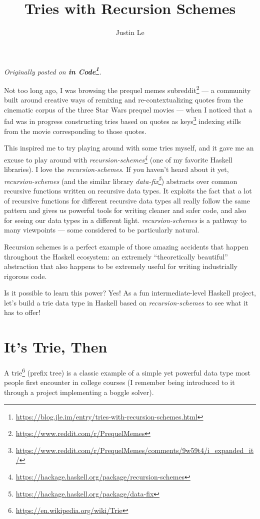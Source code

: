 \documentclass[]{article}
\title{Tries with Recursion Schemes}
\author{Justin Le}
\renewcommand{\href}[2]{#2\footnote{\url{#1}}}
\begin{document}
\maketitle

\emph{Originally posted on
\textbf{\href{https://blog.jle.im/entry/tries-with-recursion-schemes.html}{in
Code}}.}

Not too long ago, I was browsing the
\href{https://www.reddit.com/r/PrequelMemes}{prequel memes subreddit} --- a
community built around creative ways of remixing and re-contextualizing quotes
from the cinematic corpus of the three Star Wars prequel movies --- when I
noticed that a fad was in progress
\href{https://www.reddit.com/r/PrequelMemes/comments/9w59t4/i_expanded_it/}{constructing
tries based on quotes as keys} indexing stills from the movie corresponding to
those quotes.

This inspired me to try playing around with some tries myself, and it gave me an
excuse to play around with
\emph{\href{https://hackage.haskell.org/package/recursion-schemes}{recursion-schemes}}
(one of my favorite Haskell libraries). I love the \emph{recursion-schemes}. If
you haven't heard about it yet, \emph{recursion-schemes} (and the similar
library \emph{\href{https://hackage.haskell.org/package/data-fix}{data-fix}})
abstracts over common recursive functions written on recursive data types. It
exploits the fact that a lot of recursive functions for different recursive data
types all really follow the same pattern and gives us powerful tools for writing
cleaner and safer code, and also for seeing our data types in a different light.
\emph{recursion-schemes} is a pathway to many viewpoints --- some considered to
be particularly natural.

Recursion schemes is a perfect example of those amazing accidents that happen
throughout the Haskell ecosystem: an extremely ``theoretically beautiful''
abstraction that also happens to be extremely useful for writing industrially
rigorous code.

Is it possible to learn this power? Yes! As a fun intermediate-level Haskell
project, let's build a trie data type in Haskell based on
\emph{recursion-schemes} to see what it has to offer!

\hypertarget{its-trie-then}{%
\section{It's Trie, Then}\label{its-trie-then}}

A \href{https://en.wikipedia.org/wiki/Trie}{trie} (prefix tree) is a classic
example of a simple yet powerful data type most people first encounter in
college courses (I remember being introduced to it through a project
implementing a boggle solver).
\end{document}
